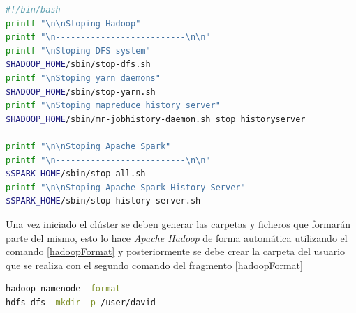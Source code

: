 \begin{lstlisting}[label=cod:stopServer,language=sh,frame=single,caption=Script de parada del clúster implementado.]
#!/bin/bash
printf "\n\nStoping Hadoop"
printf "\n--------------------------\n\n"
printf "\nStoping DFS system"
$HADOOP_HOME/sbin/stop-dfs.sh
printf "\nStoping yarn daemons"
$HADOOP_HOME/sbin/stop-yarn.sh
printf "\nStoping mapreduce history server"
$HADOOP_HOME/sbin/mr-jobhistory-daemon.sh stop historyserver

printf "\n\nStoping Apache Spark"
printf "\n--------------------------\n\n"
$SPARK_HOME/sbin/stop-all.sh
printf "\n\nStoping Apache Spark History Server"
$SPARK_HOME/sbin/stop-history-server.sh
\end{lstlisting}

Una vez iniciado el clúster se deben generar las carpetas y ficheros que formarán parte del mismo, esto lo hace \textit{Apache Hadoop} de forma automática utilizando el comando \ref{hadoopFormat} y posteriormente se debe crear la carpeta del usuario que se realiza con el segundo comando del fragmento \ref{hadoopFormat}

\begin{lstlisting}[label=hadoopFormat,language=sh,frame=single,caption=Comandos requeridos en la primera ejecución del clúster.]
hadoop namenode -format
hdfs dfs -mkdir -p /user/david	
\end{lstlisting}
